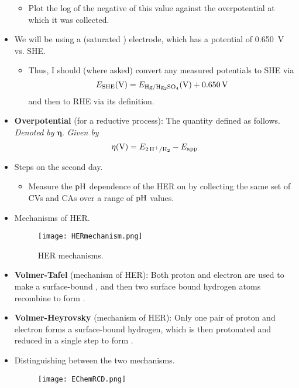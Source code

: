 \documentclass[../notes.tex]{subfiles}
\begin{document}
\begin{itemize}
\begin{itemize}
        \item Plot the log of the negative of this value against the overpotential at which it was collected.
    \end{itemize}
    \item We will be using a  (saturated ) electrode, which has a potential of \SI{0.650}{\volt} vs. SHE.
    \begin{itemize}
        \item Thus, I should (where asked) convert any measured potentials to SHE via
        \begin{equation*}
            E_\text{SHE}(\si{\volt}) = E_{\ce{Hg/Hg2SO4}}(\si{\volt})+\SI{0.650}{\volt}
        \end{equation*}
        and then to RHE via its definition.
    \end{itemize}
    \item \textbf{Overpotential} (for a reductive process): The quantity defined as follows. \emph{Denoted by} $\bm{\eta}$. \emph{Given by}
    \begin{equation*}
        \eta(\si{\volt}) = E_{\ce{2H+/H2}}-E_\text{app}
    \end{equation*}
    \item Steps on the second day.
    \begin{itemize}
        \item Measure the $\operatorname{pH}$ dependence of the HER on  by collecting the same set of CVs and CAs over a range of $\operatorname{pH}$ values.
    \end{itemize}
    \item Mechanisms of HER.
    \begin{figure}[H]
        \centering
        \texttt{[image: HERmechanism.png]}
        \caption{HER mechanisms.}
        \label{fig:HERmechanism}
    \end{figure}
    \item \textbf{Volmer-Tafel} (mechanism of HER): Both proton and electron are used to make a surface-bound , and then two surface bound hydrogen atoms recombine to form .
    \item \textbf{Volmer-Heyrovsky} (mechanism of HER): Only one pair of proton and electron forms a surface-bound hydrogen, which is then protonated and reduced in a single step to form .
    \item Distinguishing between the two mechanisms.
    \begin{figure}[h!]
        \centering
        \texttt{[image: EChemRCD.png]}

\end{figure}
\end{itemize}
\end{document}
